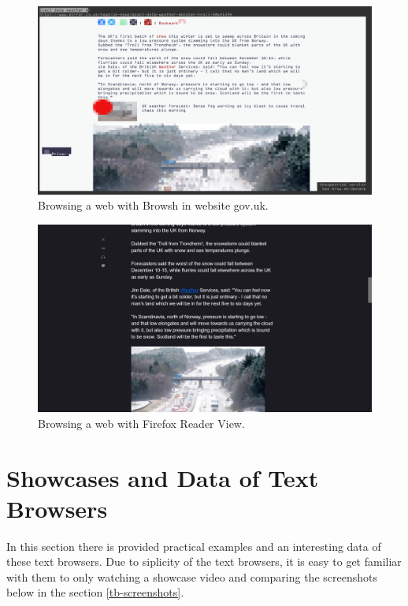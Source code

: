 \begin{figure}[tp]
\centering
\includegraphics[keepaspectratio,width=\linewidth,height=\halfh]
{images/browsh.png}

\caption[Browsh Graphical CLI Browser]
{%
Browsing a web with Browsh in website gov.uk.
}
\label{fig:browsh}
\end{figure}


\begin{figure}[tp]
\centering
\includegraphics[keepaspectratio,width=\linewidth,height=\halfh]
{images/reader-view.png}

\caption[Firefox Reader View]
{%
Browsing a web with Firefox Reader View.
}
\label{fig:firefox-rv}
\end{figure}



\section{Showcases and Data of Text Browsers}
\label{tb-general}
In this section there is provided practical examples and an interesting data  of these text browsers. Due to siplicity of the text browsers, it is easy to get familiar with them to only watching a showcase video and comparing the screenshots below in the section \ref*{tb-screenshots}.
